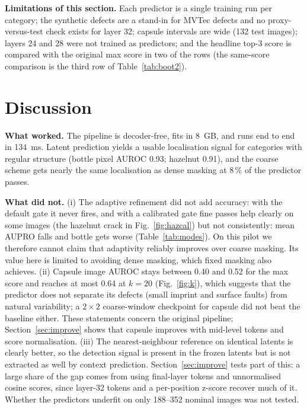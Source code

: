 \documentclass[conference]{IEEEtran}
\begin{document}
\textbf{Limitations of this section.} Each predictor is a single training run per category; the synthetic defects are a stand-in for MVTec defects and no proxy-versus-test check exists for layer 32; capsule intervals are wide (132 test images); layers 24 and 28 were not trained as predictors; and the headline top-3 score is compared with the original max score in two of the rows (the same-score comparison is the third row of Table~\ref{tab:boot2}).

\section{Discussion}\label{sec:disc}
\textbf{What worked.} The pipeline is decoder-free, fits in 8~GB, and runs end to end in 134~ms. Latent prediction yields a usable localisation signal for categories with regular structure (bottle pixel AUROC 0.93; hazelnut 0.91), and the coarse scheme gets nearly the same localisation as dense masking at 8\,\% of the predictor passes.

\textbf{What did not.} (i) The adaptive refinement did not add accuracy: with the default gate it never fires, and with a calibrated gate fine passes help clearly on some images (the hazelnut crack in Fig.~\ref{fig:hazcal}) but not consistently: mean AUPRO falls and bottle gets worse (Table~\ref{tab:modes}). On this pilot we therefore cannot claim that adaptivity reliably improves over coarse masking. Its value here is limited to avoiding dense masking, which fixed masking also achieves. (ii) Capsule image AUROC stays between 0.40 and 0.52 for the max score and reaches at most 0.64 at $k=20$ (Fig.~\ref{fig:k}), which suggests that the predictor does not separate its defects (small imprint and surface faults) from natural variability; a $2\times2$ coarse-window checkpoint for capsule did not beat the baseline either. These statements concern the original pipeline; Section~\ref{sec:improve} shows that capsule improves with mid-level tokens and score normalisation. (iii) The nearest-neighbour reference on identical latents is clearly better, so the detection signal is present in the frozen latents but is not extracted as well by context prediction. Section~\ref{sec:improve} tests part of this: a large share of the gap comes from using final-layer tokens and unnormalised cosine scores, since layer-32 tokens and a per-position z-score recover much of it. Whether the predictors underfit on only 188--352 nominal images was not tested.
\end{document}
